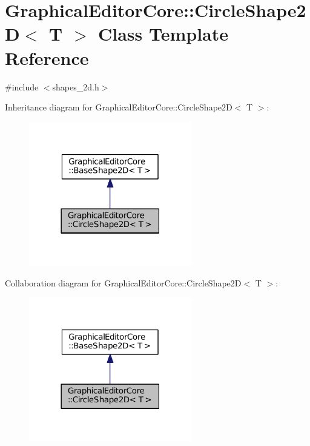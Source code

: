 \hypertarget{classGraphicalEditorCore_1_1CircleShape2D}{}\section{Graphical\+Editor\+Core\+:\+:Circle\+Shape2D$<$ T $>$ Class Template Reference}
\label{classGraphicalEditorCore_1_1CircleShape2D}


{\ttfamily \#include $<$shapes\+\_\+2d.\+h$>$}



Inheritance diagram for Graphical\+Editor\+Core\+:\+:Circle\+Shape2D$<$ T $>$\+:
\nopagebreak
\begin{figure}[H]
\begin{center}
\leavevmode
\includegraphics[width=201pt]{classGraphicalEditorCore_1_1CircleShape2D__inherit__graph}
\end{center}
\end{figure}


Collaboration diagram for Graphical\+Editor\+Core\+:\+:Circle\+Shape2D$<$ T $>$\+:
\nopagebreak
\begin{figure}[H]
\begin{center}
\leavevmode
\includegraphics[width=201pt]{classGraphicalEditorCore_1_1CircleShape2D__coll__graph}
\end{center}
\end{figure}
